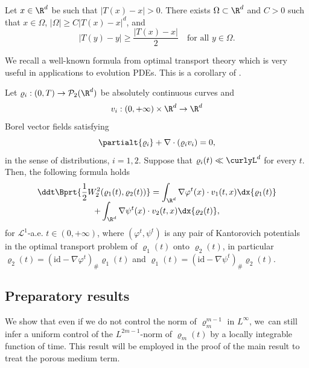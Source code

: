 \begin{lemma}\label{lemma 1}
Let $x\in \R^d$ be such that $|T(x)-x|>0$. There exists $\Omega\subset\R^d$ and $C>0$ such that $x\in \Omega$, $|\Omega|\geq C |T(x)-x|^d$, and
\begin{equation*}
|T(y)-y|\geq \frac{|T(x)-x|}{2} \quad \text{for all } y\in \Omega.
\end{equation*}
\end{lemma}

We recall a well-known formula from optimal transport theory which is very useful in applications to evolution PDEs. This is a corollary of \cite[Th.\,8.4.7]{AGS2008}.
\begin{lemma}
Let $\varrho_i : (0,T)\to\mathcal{P}_2(\R^d)$ be absolutely continuous curves and
\[
v_i: (0,+\infty) \times \R^d \to \R^d
\]
Borel vector fields satisfying
\begin{equation*}
\partialt{\varrho_i} +\nabla\cdot(\varrho_i v_i)=0,
\end{equation*}
in the sense of distributions, $i=1,2$. Suppose that $\varrho_i(t) \ll \curlyL^d$ for every $t$.
Then, the following formula holds
\begin{multline}\label{recall_ dt W_2}
\ddt \Bprt{\frac 12 W_2^2(\varrho_1(t), \varrho_2(t))} = \int_{\R^d} \nabla \varphi^t(x) \cdot v_1(t,x) \dx{\varrho_1(t)}\\[-5pt]
+ \int_{\R^d} \nabla \psi^t(x) \cdot v_2(t,x) \dx{\varrho_2(t)},
\end{multline}
for $\mathcal{L}^1$-a.e. $t\in (0,+\infty)$, where $(\varphi^t,\psi^t)$ is any pair of Kantorovich potentials in the optimal transport problem of $\varrho_1(t)$ onto $\varrho_2(t)$, in particular $\varrho_2(t) = (\mathrm{id} - \nabla\varphi^t)_\#\varrho_1(t)$ and $\varrho_1(t) = (\mathrm{id} - \nabla\psi^t)_\#\varrho_2(t).$
\end{lemma}

\subsection{Preparatory results}

We show that even if we do not control the norm of $\varrho_m^{m-1}$ in $L^\infty$, we~can still infer a uniform control of the $L^{2m-1}$-norm of $\varrho_m(t)$ by a locally integrable function of time. This result will be employed in the proof of the main result to treat the porous medium term.

